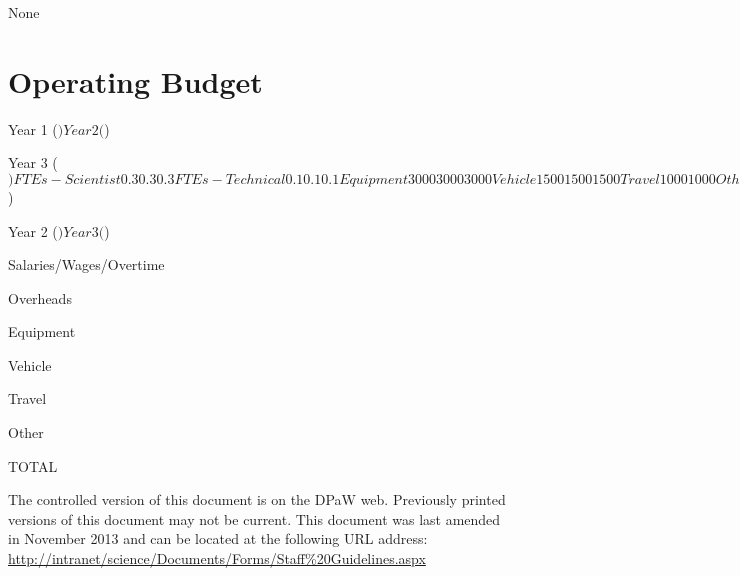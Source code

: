 \documentclass[version=last, paper=a4, DIV=18, usenames, dvipsnames]{scrartcl}
\begin{document}
None






\section{Operating Budget}



Year 1 (\()


Year 2 (\))


Year 3 (\()


FTEs - Scientist


0.3


0.3


0.3


FTEs - Technical


0.1


0.1


0.1


Equipment


3000


3000


3000


Vehicle


1500


1500


1500


Travel


1000


1000


Other


TOTAL


4500


5500


5500


External Funds


Year 1 (\))


Year 2 (\()


Year 3 (\))


Salaries/Wages/Overtime


Overheads


Equipment


Vehicle


Travel


Other


TOTAL

The controlled version of this document is on the DPaW web. Previously printed versions of this document may not be current. This document was last amended in November 2013 and can be located at the following URL address: \href{http://intranet/science/Documents/Forms/Staff%20Guidelines.aspx}{http://intranet/science/Documents/Forms/Staff\%20Guidelines.aspx}







\clearpage
\end{document}
